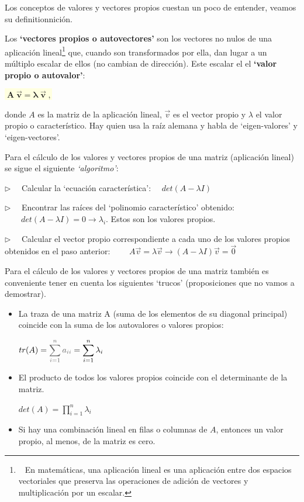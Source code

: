 Los conceptos de valores y vectores propios cuestan un poco de entender, veamos su definitionnición.

\begin{definition}

Los \textbf{`vectores propios o autovectores'} son los vectores no nulos de una aplicación lineal\footnote{$\ \ $ En matemáticas, una aplicación lineal es una aplicación entre dos espacios vectoriales que preserva las operaciones de adición de vectores y multiplicación por un escalar.} que, cuando son transformados por ella, dan lugar a un múltiplo escalar de ellos (no cambian de dirección). Este escalar el el \textbf{`valor propio o autovalor'}:

\vspace{4mm}\centerline{\colorbox{LightYellow}{$\boldsymbol{\; A\; \vec v = \lambda \; \vec v  \;,}$}}

\justify
donde $A$ es la matriz de la aplicación lineal, $\vec v$ es el vector propio y $\lambda$ el valor propio o característico. Hay quien usa la raíz alemana y habla de `eigen-valores' y `eigen-vectores'.

\end{definition}

Para el cálculo de los valores y vectores propios de una matriz (aplicación lineal) se sigue el siguiente \emph{`algoritmo'}:

\begin{cuadro-naranja}


$\triangleright \quad$ Calcular la `ecuación característica': $\quad det(A-\lambda I)$

$\triangleright \quad$  Encontrar las raíces del `polinomio característico' obtenido: 
$ \qquad det(A-\lambda I)=0 \longrightarrow \lambda_i$. Estos son los valores propios.

$\triangleright \quad$  Calcular el vector propio correspondiente a cada uno de los valores propios obtenidos en el paso anterior:	
$\qquad A\vec v=\lambda \vec v \to (A-\lambda  I)\vec v=\vec 0$

\end{cuadro-naranja}

Para el cálculo de los valores y vectores propios de una matriz también es conveniente tener en cuenta los siguientes `trucos' \textcolor{gris}{(proposiciones que no vamos a demostrar)}.

\begin{itemize}
\item La traza de una matriz A (suma de los elementos de su diagonal principal)	coincide con la suma de los autovalores o valores propios:

$\displaystyle tr(A)=\textcolor{gris}{\sum_{i=1}^n a_{ii}}=\sum_{i=1}^n \lambda_i$

\item El producto de todos los valores propios coincide con el determinante de la matriz.

$\displaystyle det(A)=\prod_{i=1}^n \lambda_i$

\item Si hay una combinación lineal en filas o columnas de $A$, entonces un valor propio, al menos, de la matriz es cero.
\end{itemize}

